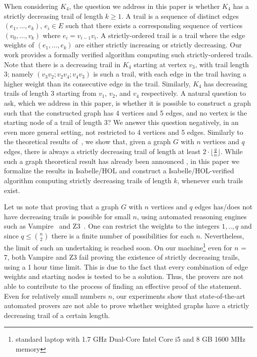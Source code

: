 \begin{isabellebody}
\begin{isamarkuptext}
\noindent When considering $K_4$, the question we address in this paper is whether $K_4$ has a 
strictly decreasing trail of length $k\geq 1$. A trail is a sequence of distinct edges $(e_1,\ldots,e_k)$, $e_i \in E$ such that
there exists a corresponding sequence of vertices $(v_0,...,v_k)$ where $e_i = v_{i-1}v_i$. 
A strictly-ordered trail is a trail where the edge weights of $(e_1,\ldots,e_k)$ are either strictly increasing or strictly decreasing.
Our work provides a formally verified algorithm 
computing such strictly-ordered trails. Note that there is a decreasing trail in $K_4$ starting at vertex $v_3$, 
with trail length 3; namely $(v_3v_2; v_2v_4; v_4v_3)$ is such a trail, with each edge in the trail having 
a higher weight than its consecutive edge in the trail. Similarly, $K_4$ has decreasing trails of 
length 3 starting from $v_1$, $v_2$, and $v_4$ respectively. A natural question to ask,
which we address in this paper, is whether it is possible to construct a graph such that the 
 constructed graph has 4 vertices and 5 edges, and no vertex is the starting node of a trail of 
length 3? We answer this question negatively, in an even more general setting,  not restricted to 4 
vertices and 5 edges. Similarly to the theoretical results of~\cite{graham1973increasing}, we show 
that, given a graph $G$ with $n$ vertices and $q$ edges, there is always a strictly decreasing trail of length at least
$2 \cdot \lfloor\frac{q}{n}\rfloor$. While such a graph theoretical result has already been announced 
\cite{graham1973increasing}, in this paper we formalize the results in Isabelle/HOL and construct 
a Isabelle/HOL-verified algorithm computing strictly decreasing trails of length $k$, whenever such trails exist.

Let us note that proving that a
 graph $G$ with $n$ vertices and $q$ edges has/does not have decreasing trails is possible for small 
$n$, using automated reasoning engines such as Vampire~\cite{Vampire13} and Z3~\cite{de2008z3}. 
One can restrict the weights to the integers $1,..,q$ and since $q \le {n \choose 2}$ there is a 
finite number of possibilities for each $n$. 
Nevertheless, the limit of such an undertaking is
reached soon. On our machine\footnote{standard laptop with
1.7 GHz Dual-Core Intel Core i5 and  8 GB 1600 MHz memory} even for $n$ = 7, both Vampire and Z3 fail 
proving the existence of strictly decreasing trails, using a 1 hour time limit. This
is due to the fact that every combination of edge weights and starting nodes is
tested to be a solution. Thus, the provers are not able to contribute to the process of finding an 
effective proof of the statement. Even for relatively small numbers $n$, our experiments show that 
state-of-the-art automated  provers are not able to prove whether weighted graphs have a strictly decreasing trail 
of a certain length.


\end{isamarkuptext}
\end{isabellebody}
